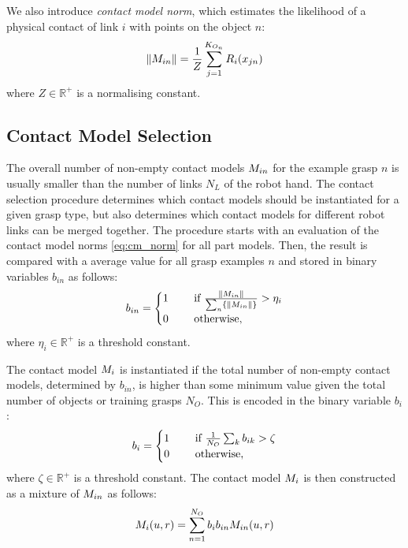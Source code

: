 We also introduce \textit{contact model norm}, which estimates the likelihood of a physical contact of link $i$ with points on the object $n$:
\begin{equation}\label{eq:cm_norm}
\|M_{in}\| = \frac 1Z \sum_{j=1}^{K_{O_n}} R_{i}(x_{jn})
\end{equation}
where $Z \in \mathbb R^+$ is a normalising constant.

\subsection{Contact Model Selection}

The overall number of non-empty contact models $M_{in}$ for the example grasp $n$ is usually smaller than the number of links $N_L$ of the robot hand. The contact selection procedure determines which contact models should be instantiated for a given grasp type, but also determines which contact models for different robot links can be merged together. The procedure starts with an evaluation of the contact model norms \eqref{eq:cm_norm} for all part models. Then, the result is compared with a average value for all grasp examples $n$ and stored in binary variables $b_{in}$ as follows:
\begin{equation}
b_{in} = \begin{cases} 1 \quad &\textnormal{ if } \frac{\|M_{in}\|}{\sum_n\{\|M_{in}\|\}} > \eta_i \\
0 \quad &\textnormal{ otherwise},\end{cases}
\label{eq:cm_n_binary}
\end{equation}
where $\eta_i \in \mathbb{R}^+$ is a threshold constant.

The contact model $M_i$ is instantiated if the total number of non-empty contact models, determined by $b_{in}$, is higher than some minimum value given the total number of objects or training grasps $N_O$. This is encoded in the binary variable $b_i$:
\begin{equation}
b_i = \begin{cases} 1 \quad &\textnormal{ if } \frac{1}{N_O} \sum_k b_{ik} > \zeta\\
0 \quad &\textnormal{ otherwise},\end{cases}
\label{eq:cm_binary}
\end{equation}
where $\zeta \in \mathbb{R}^+$ is a threshold constant. The contact model $M_i$ is then constructed as a mixture of $M_{in}$ as follows:
\begin{equation}\label{eq:cm}
M_{i}(u, r) = \sum_{n=1}^{N_O} b_{i} b_{in} M_{in}(u, r)
\end{equation}

